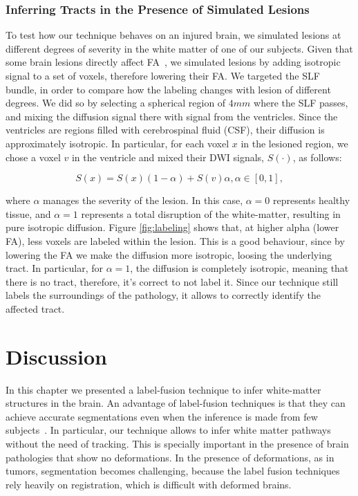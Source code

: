 \subsubsection{Inferring Tracts in the Presence of Simulated Lesions}
To test how our technique behaves on an injured brain, we simulated
lesions at different degrees of severity in the white matter of one of our subjects.
Given that some brain lesions directly affect FA~\cite{Schonberg2006, Huisman2009},
we simulated lesions by adding isotropic signal to a set of voxels, therefore
lowering their FA. We targeted the SLF bundle, in order to compare how the labeling
changes with lesion of different degrees. We did so by selecting a spherical region
of $4mm$ where the SLF passes, and mixing the diffusion signal there with signal
from the ventricles. Since the ventricles are regions filled with cerebrospinal
fluid (CSF), their diffusion is approximately isotropic. In particular, for each
voxel $x$ in the lesioned region, we chose a voxel $v$ in the ventricle and mixed
their DWI signals, $S(\cdot)$, as follows:

\begin{equation}
    \label{eq:mixing}
S(x) = S(x)(1-\alpha) + S(v)\alpha, \alpha \in [0,1],
\end{equation}

where $\alpha$ manages the severity of the lesion. In this case, $\alpha=0$
represents healthy tissue, and $\alpha=1$ represents a total disruption of
the white-matter, resulting in pure isotropic diffusion. Figure \ref{fig:labeling}
shows that, at higher alpha (lower FA), less voxels are labeled within the lesion.
This is a good behaviour, since by lowering the FA we make the diffusion more
isotropic, loosing the underlying tract. In particular, for $\alpha=1$, the
diffusion is completely isotropic, meaning that there is no tract, therefore,
it's correct to not label it. Since our technique still labels the surroundings
of the pathology, it allows to correctly identify the affected tract.

\section{Discussion}
In this chapter we presented a label-fusion technique to infer white-matter
structures in the brain. An advantage of label-fusion techniques is that
they can achieve accurate segmentations even when the inference is
made from few subjects~\cite{Asman2013}. In particular, our technique allows to
infer white matter pathways without the need of tracking. This is specially
important in the presence of brain pathologies that show no deformations.
In the presence of deformations, as in tumors, segmentation becomes challenging,
because the label fusion techniques rely heavily on registration, which is
difficult with deformed brains.

